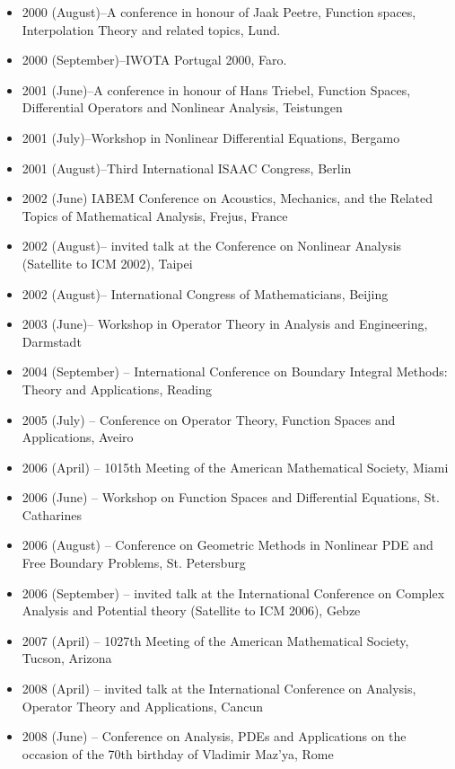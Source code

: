 \documentclass{article}
\begin{document}
\begin{itemize}
         \item 2000 (August)--A conference in honour of Jaak Peetre, 
Function spaces, Interpolation Theory and related topics, Lund.
         \item 2000 (September)--IWOTA Portugal 2000, Faro.
         \item 2001 (June)--A conference in honour of Hans Triebel, 
Function Spaces, Differential Operators and Nonlinear Analysis,
          Teistungen
         \item 2001 (July)--Workshop in Nonlinear Differential 
Equations, Bergamo
         \item 2001 (August)--Third International ISAAC Congress, Berlin
        \item 2002 (June) IABEM Conference on  Acoustics, Mechanics, and the Related Topics of Mathematical Analysis, Frejus, France
         \item 2002 (August)-- invited talk at the Conference on 
Nonlinear Analysis (Satellite to ICM 2002), Taipei
         \item 2002 (August)-- International Congress of 
Mathematicians, Beijing
         \item 2003 (June)-- Workshop in Operator Theory in Analysis and
Engineering, Darmstadt
         \item 2004 (September) -- International Conference on Boundary Integral Methods: Theory and Applications, Reading
         \item 2005 (July) -- Conference on Operator Theory, Function Spaces and Applications, Aveiro
         \item 2006 (April) -- 1015th Meeting of the American Mathematical Society, Miami
         \item 2006 (June) -- Workshop on Function Spaces and Differential Equations, St. Catharines
         \item 2006 (August) -- Conference on Geometric Methods in Nonlinear PDE and Free Boundary Problems, St. Petersburg
         \item 2006 (September) -- invited talk at the International Conference on Complex Analysis and Potential theory (Satellite to ICM 2006), Gebze
         \item 2007 (April) -- 1027th Meeting of the American Mathematical Society, Tucson, Arizona
         \item 2008 (April) -- invited talk at the International Conference on Analysis, Operator Theory and Applications, Cancun
         \item 2008 (June) -- Conference on Analysis, PDEs and Applications on the occasion of the 70th birthday of Vladimir Maz'ya, Rome

\end{itemize}
\end{document}
